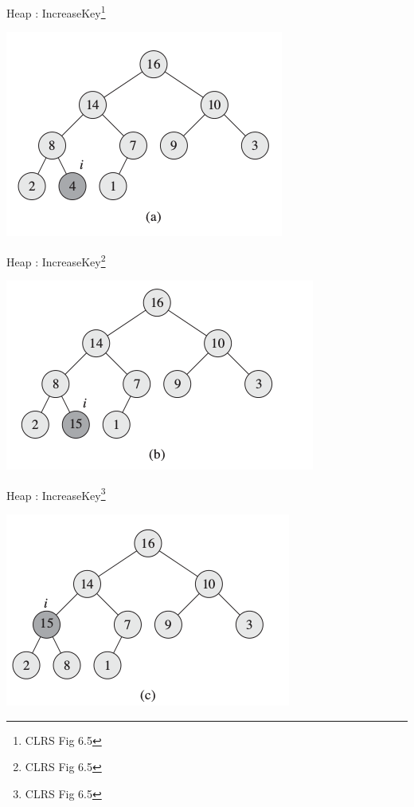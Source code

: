 \documentclass{beamer}
\begin{document}
\begin{frame}{Heap : IncreaseKey\footnote{CLRS Fig 6.5}}
    \begin{center}
        \includegraphics[scale=0.5]{heapIncreaseKey1.png}
    \end{center}
\end{frame}


\begin{frame}{Heap : IncreaseKey\footnote{CLRS Fig 6.5}}
    \begin{center}
        \includegraphics[scale=0.5]{heapIncreaseKey2.png}
    \end{center}
\end{frame}


\begin{frame}{Heap : IncreaseKey\footnote{CLRS Fig 6.5}}
    \begin{center}
        \includegraphics[scale=0.5]{heapIncreaseKey3.png}
    \end{center}
\end{frame}
\end{document}
